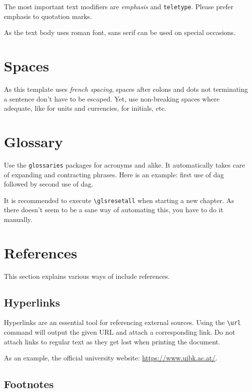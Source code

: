 The most important text modifiers are \emph{emphasis} and \texttt{teletype}.
Please prefer emphasis to quotation marks.

As the text body uses roman font, \textsf{sans serif} can be used on special occasions.

\section{Spaces}

As this template uses \emph{french spacing}, spaces after colons and dots not terminating a sentence don't have to be escaped.
Yet, use non-breaking spaces where adequate, like for units and currencies, for initials, etc.

\section{Glossary}

Use the \texttt{glossaries} packages for acronyms and alike.
It automatically takes care of expanding and contracting phrases.
Here is an example: first use of \gls{dag} followed by second use of \gls{dag}.

It is recommended to execute \texttt{\textbackslash{}glsresetall} when starting a new chapter.
As there doesn't seem to be a sane way of automating this, you have to do it manually.

\section{References}

This section explains various ways of include references.

\subsection{Hyperlinks}

Hyperlinks are an essential tool for referencing external sources.
Using the \texttt{\textbackslash{}url} command will output the given URL and attach a corresponding link.
Do not attach links to regular text as they get lost when printing the document.

As an example, the official university website: \url{https://www.uibk.ac.at/}.

\subsection{Footnotes}

